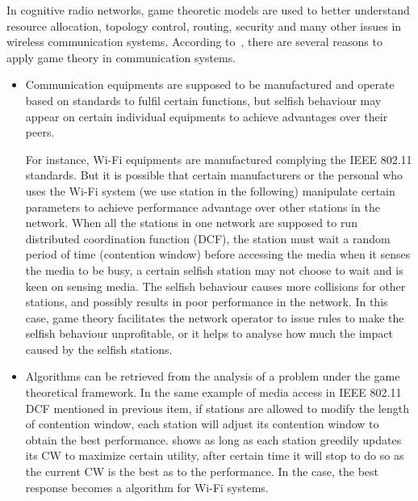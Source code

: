 In cognitive radio networks, game theoretic models are used to better understand resource allocation, topology control, routing, security and many other issues in wireless communication systems.
According to~\cite{game_for_communication_01}, there are several reasons to apply game theory in communication systems.
\begin{itemize}
\item Communication equipments are supposed to be manufactured and operate based on standards to fulfil certain functions, but selfish behaviour may appear on certain individual equipments to achieve advantages over their peers.

For instance, Wi-Fi equipments are manufactured complying the IEEE 802.11 standards.
But it is possible that certain manufacturers or the personal who uses the Wi-Fi system (we use station in the following) manipulate certain parameters to achieve performance advantage over other stations in the network.
When all the stations in one network are supposed to run distributed coordination function (DCF), \ie the station must wait a random period of time (contention window) before accessing the media when it senses the media to be busy, a certain selfish station may not choose to wait and is keen on sensing media.
The selfish behaviour causes more collisions for other stations, and possibly results in poor performance in the network.
In this case, game theory facilitates the network operator to issue rules to make the selfish behaviour unprofitable, or it helps to analyse how much the impact caused by the selfish stations.

\item Algorithms can be retrieved from the analysis of a problem under the game theoretical framework.
In the same example of media access in IEEE 802.11 DCF mentioned in previous item, if stations are allowed to modify the length of contention window, each station will adjust its contention window to obtain the best performance.
\cite{contentiongame_07} shows as long as each station greedily updates its CW to maximize certain utility, after certain time it will stop to do so as the current CW is the best as to the performance.
In the case, the best response becomes a algorithm for Wi-Fi systems.



\end{itemize}
